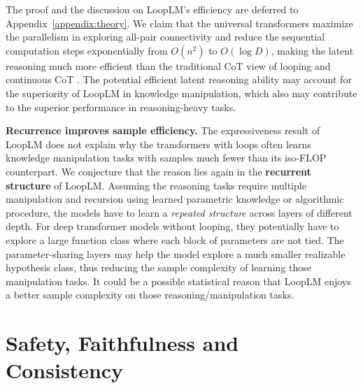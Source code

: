 \documentclass[]{bytedance_seed}
\newcommand{\1}{\mathbf{1}}
\newcommand{\ut}{LoopLM}
\begin{document}
{The proof and the discussion on \ut{}'s efficiency are deferred to Appendix~\ref{appendix:theory}. We claim that the universal transformers maximize the parallelism in exploring all-pair connectivity and reduce the sequential computation steps exponentially from $O(n^2)$ to $O(\log D)$, making the latent reasoning much more efficient than the traditional CoT view of looping \cite{saunshi2025reasoning} and continuous CoT \cite{zhu2025reasoning}. The potential efficient latent reasoning ability may account for the superiority of \ut{} in knowledge manipulation, which also may contribute to the superior performance in reasoning-heavy tasks.

\textbf{Recurrence improves sample efficiency.} The expressiveness result of \ut{} does not explain why the transformers with loops often learns knowledge manipulation tasks with samples much fewer than its iso-FLOP counterpart. We conjecture that the reason lies again in the \textbf{recurrent structure} of \ut{}. Assuming the reasoning tasks require multiple manipulation and recursion using learned parametric knowledge or algorithmic procedure, the models have to learn a \textit{repeated structure} across layers of different depth. For deep transformer models without looping, they potentially have to explore a large function class where each block of parameters are not tied. The parameter-sharing layers may help the model explore a much smaller realizable hypothesis class, thus reducing the sample complexity of learning those manipulation tasks. It could be a possible statistical reason that \ut{} enjoys a better sample complexity on those reasoning/manipulation tasks.

\section{Safety, Faithfulness and Consistency}
}
\end{document}
